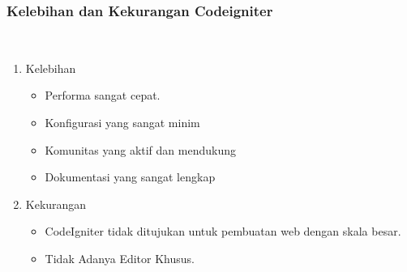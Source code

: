 \subsubsection{Kelebihan dan Kekurangan Codeigniter}
\hfill\\
\begin{enumerate}
\item Kelebihan
	\begin{itemize}
	\item Performa sangat cepat.
	\item Konfigurasi yang sangat minim
	\item Komunitas yang aktif dan mendukung
	\item Dokumentasi yang sangat lengkap
	\end{itemize}
\item Kekurangan
\begin{itemize}
	\item CodeIgniter tidak ditujukan untuk pembuatan web dengan skala besar.
	\item Tidak Adanya Editor Khusus.
\end{itemize}
\end{enumerate}

